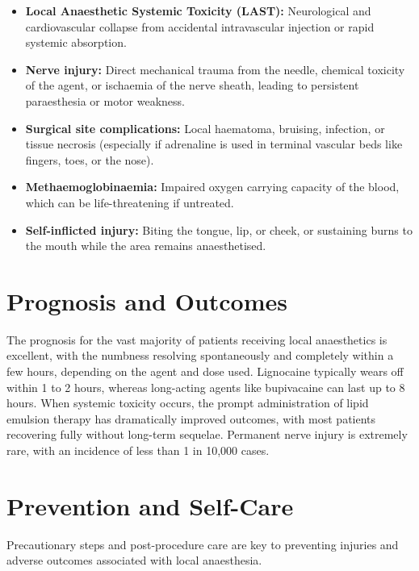 \begin{itemize}
    \item \textbf{Local Anaesthetic Systemic Toxicity (LAST):} Neurological and cardiovascular collapse from accidental intravascular injection or rapid systemic absorption.
    \item \textbf{Nerve injury:} Direct mechanical trauma from the needle, chemical toxicity of the agent, or ischaemia of the nerve sheath, leading to persistent paraesthesia or motor weakness.
    \item \textbf{Surgical site complications:} Local haematoma, bruising, infection, or tissue necrosis (especially if adrenaline is used in terminal vascular beds like fingers, toes, or the nose).
    \item \textbf{Methaemoglobinaemia:} Impaired oxygen carrying capacity of the blood, which can be life-threatening if untreated.
    \item \textbf{Self-inflicted injury:} Biting the tongue, lip, or cheek, or sustaining burns to the mouth while the area remains anaesthetised.
\end{itemize}

\section*{Prognosis and Outcomes}
The prognosis for the vast majority of patients receiving local anaesthetics is excellent, with the numbness resolving spontaneously and completely within a few hours, depending on the agent and dose used. Lignocaine typically wears off within 1 to 2 hours, whereas long-acting agents like bupivacaine can last up to 8 hours. When systemic toxicity occurs, the prompt administration of lipid emulsion therapy has dramatically improved outcomes, with most patients recovering fully without long-term sequelae. Permanent nerve injury is extremely rare, with an incidence of less than 1 in 10,000 cases.

\section*{Prevention and Self-Care}
Precautionary steps and post-procedure care are key to preventing injuries and adverse outcomes associated with local anaesthesia.

